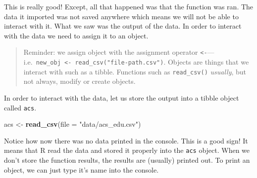 \documentclass[
]{book}
\newenvironment{Shaded}{\begin{snugshade}}{\end{snugshade}}
\newcommand{\DataTypeTok}[1]{\textcolor[rgb]{0.13,0.29,0.53}{#1}}
\newcommand{\KeywordTok}[1]{\textcolor[rgb]{0.13,0.29,0.53}{\textbf{#1}}}
\newcommand{\NormalTok}[1]{#1}
\newcommand{\StringTok}[1]{\textcolor[rgb]{0.31,0.60,0.02}{#1}}
\begin{document}
This is really good! Except, all that happened was that the function was ran. The data it imported was not saved anywhere which means we will not be able to interact with it. What we saw was the output of the data. In order to interact with the data we need to assign it to an object.

\begin{quote}
Reminder: we assign object with the assignment operator \texttt{\textless{}-}---i.e.~\texttt{new\_obj\ \textless{}-\ read\_csv("file-path.csv")}. Objects are things that we interact with such as a tibble. Functions such as \texttt{read\_csv()} \emph{usually}, but not always, modify or create objects.
\end{quote}

In order to interact with the data, let us store the output into a tibble object called \texttt{acs}.

\begin{Shaded}
\begin{Highlighting}[]
\NormalTok{acs \textless{}{-}}\StringTok{ }\KeywordTok{read\_csv}\NormalTok{(}\DataTypeTok{file =} \StringTok{"data/acs\_edu.csv"}\NormalTok{) }
\end{Highlighting}
\end{Shaded}

Notice how now there was no data printed in the console. This is a good sign! It means that R read the data and stored it properly into the \texttt{acs} object. When we don't store the function results, the results are (usually) printed out. To print an object, we can just type it's name into the console.
\end{document}

